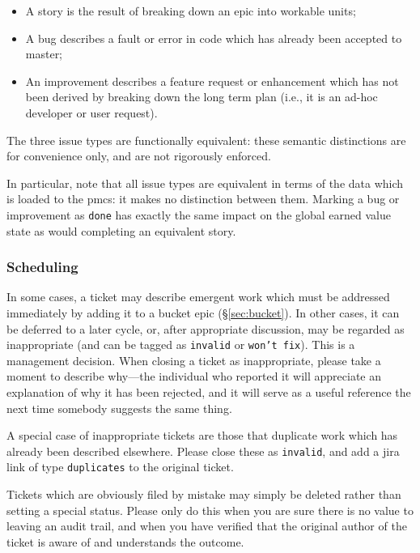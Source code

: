 \begin{itemize}
\item
  A \gls{story} is the result of breaking down an \gls{epic} into workable units;
\item
  A bug describes a fault or error in code which has already been accepted to master;
\item
  An improvement describes a feature request or enhancement which has not been derived by breaking down the long term plan (i.e., it is an ad-hoc developer or user request).
\end{itemize}

The three issue types are functionally equivalent: these semantic distinctions are for convenience only, and are not rigorously enforced.

In particular, note that all issue types are equivalent in terms of the data which is loaded to the \gls{pmcs}: it makes no distinction between them.
Marking a bug or improvement as \texttt{done} has exactly the same impact on the global earned value state as would completing an equivalent \gls{story}.

\subsubsection{Scheduling}
\label{sec:scheduling}

In some cases, a ticket may describe emergent work which must be addressed immediately by adding it to a bucket \gls{epic} (\S\ref{sec:bucket}).
In other cases, it can be deferred to a later \gls{cycle}, or, after appropriate discussion, may be regarded as inappropriate (and can be tagged as \texttt{invalid} or \texttt{won't fix}).
This is a management decision.
When closing a ticket as inappropriate, please take a moment to describe why---the individual who reported it will appreciate an explanation of why it has been rejected, and it will serve as a useful reference the next time somebody suggests the same thing.

A special case of inappropriate tickets are those that duplicate work which has already been described elsewhere.
Please close these as \texttt{invalid}, and add a \gls{jira} link of type \texttt{duplicates} to the original ticket.

Tickets which are obviously filed by mistake may simply be deleted
rather than setting a special status. Please only do this when you are
sure there is no value to leaving an audit trail, and when you have
verified that the original author of the ticket is aware of and
understands the outcome.

